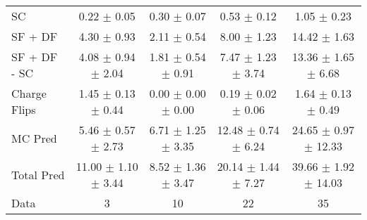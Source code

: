 \begin{tabular}{l|cccc}
                                 SC &  0.22 $\pm$  0.05 &  0.30 $\pm$  0.07 &  0.53 $\pm$  0.12 &  1.05 $\pm$  0.23 \\
                            SF + DF &  4.30 $\pm$  0.93 &  2.11 $\pm$  0.54 &  8.00 $\pm$  1.23 & 14.42 $\pm$  1.63 \\
\hline
                       SF + DF - SC &  4.08 $\pm$  0.94 $\pm$  2.04 &  1.81 $\pm$  0.54 $\pm$  0.91 &  7.47 $\pm$  1.23 $\pm$  3.74 & 13.36 $\pm$  1.65 $\pm$  6.68 \\
\hline\hline
                       Charge Flips &  1.45 $\pm$  0.13 $\pm$  0.44 &  0.00 $\pm$  0.00 $\pm$  0.00 &  0.19 $\pm$  0.02 $\pm$  0.06 &  1.64 $\pm$  0.13 $\pm$  0.49 \\
\hline
                            MC Pred &  5.46 $\pm$  0.57 $\pm$  2.73 &  6.71 $\pm$  1.25 $\pm$  3.35 & 12.48 $\pm$  0.74 $\pm$  6.24 & 24.65 $\pm$  0.97 $\pm$ 12.33 \\
\hline
                         Total Pred & 11.00 $\pm$  1.10 $\pm$  3.44 &  8.52 $\pm$  1.36 $\pm$  3.47 & 20.14 $\pm$  1.44 $\pm$  7.27 & 39.66 $\pm$  1.92 $\pm$ 14.03 \\
\hline\hline
                               Data &     3 &    10 &    22 &    35 \\
\hline\hline
\end{tabular}

